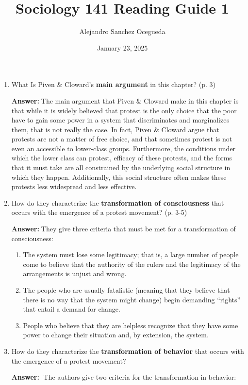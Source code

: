 \documentclass{article}
\title{Sociology 141 Reading Guide 1}
\author{Alejandro Sanchez Ocegueda}
\date{January 23, 2025}
\newcommand{\answer}{\textbf{Answer:}$\;$}
\begin{document}
\maketitle

\begin{enumerate}[label=\arabic*)]
    \item What Is Piven \& Cloward's \textbf{main argument} in this chapter? (p. 3)

    \answer The main argument that Piven \& Cloward make in this chapter is that while it is widely believed that protest is the only choice that the poor have to gain some power in a system that discriminates and marginalizes them, that is not really the case.
    In fact, Piven \& Cloward argue that protests are not a matter of free choice, and that sometimes protest is not even an accessible to lower-class groups.
    Furthermore, the conditions under which the lower class can protest, efficacy of these protests, and the forms that it must take are all constrained by the underlying social structure in which they happen.
    Additionally, this social structure often makes these protests less widespread and less effective.

    \item How do they characterize the \textbf{transformation of consciousness} that occurs with the emergence of a protest movement? (p. 3-5)

    \answer They give three criteria that must be met for a transformation of consciousness:
    \begin{enumerate}
        \item The system must lose some legitimacy;
        that is, a large number of people come to believe that the authority of the rulers and the legitimacy of the arrangements is unjust and wrong.
        \item The people who are usually fatalistic (meaning that they believe that there is no way that the system might change) begin demanding ``rights'' that entail a demand for change.
        \item People who believe that they are helpless recognize that they have some power to change their situation and, by extension, the system.
    \end{enumerate}

    \item How do they characterize the \textbf{transformation of behavior} that occurs with the emergence of a protest movement?    

    \answer
    The authors give two criteria for the transformation in behavior:


\end{enumerate}
\end{document}
